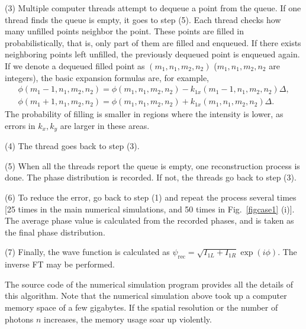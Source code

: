 \documentclass[pra,english,reprint,nofootinbib,aps,superscriptaddress,showpacs,showkeys]{revtex4-2}
\theoremstyle{definition}
\theoremstyle{remark}
\begin{document}
\begin{widetext}
		(3) Multiple computer threads attempt to dequeue a point from the queue. If one thread finds the queue is empty, it goes to step (5). Each thread checks how many unfilled points neighbor the point. These points are filled in probabilistically, that is, only part of them are filled and enqueued. If there exists neighboring points left unfilled, the previously dequeued point is enqueued again. If we denote a dequeued filled point as $(m_1,n_1,m_2,n_2)$ ($m_1,n_1,m_2,n_2$ are integers), the basic expansion formulas are, for example,
		\begin{gather}
			\phi(m_1-1,n_1,m_2,n_2)=\phi(m_1,n_1,m_2,n_2)-k_{1x}(m_1-1,n_1,m_2,n_2)\varDelta,\nonumber\\
			\phi(m_1+1,n_1,m_2,n_2)=\phi(m_1,n_1,m_2,n_2)+k_{1x}(m_1,n_1,m_2,n_2)\varDelta.
		\end{gather}
		The probability of filling is smaller in regions where the intensity is lower, as errors in $k_x,k_y$ are larger in these areas.
		
		(4) The thread goes back to step (3).
		
		(5) When all the threads report the queue is empty, one reconstruction process is done. The phase distribution is recorded. If not, the threads go back to step (3).
		
		(6) To reduce the error, go back to step (1) and repeat the process several times [25 times in the main numerical simulations, and 50 times in Fig.~\ref{figcase1} (i)]. The average phase value is calculated from the recorded phases, and is taken as the final phase distribution.
		
		(7) Finally, the wave function is calculated as $\psi_\textrm{rec}=\sqrt{I_{1L}+I_{1R}}\exp(i\phi)$. The inverse FT may be performed.
		
		The source code of the numerical simulation program \cite{SourceCode} provides all the details of this algorithm. Note that the numerical simulation above took up a computer memory space of a few gigabytes. If the spatial resolution or the number of photons $n$ increases, the memory usage soar up violently.
	\end{widetext}
	
\end{document}
